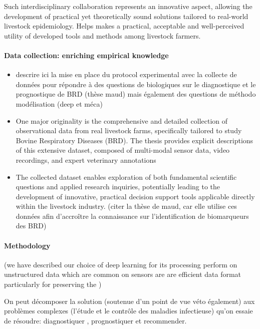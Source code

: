 Such interdisciplinary collaboration represents an innovative aspect, allowing the development of practical yet theoretically sound solutions tailored to real-world livestock epidemiology. Helps makes a practical, acceptable and well-perceived utility of developed tools and methods among livestock farmers.

\paragraph{Data collection: enriching empirical knowledge}

\begin{itemize}
    \item descrire ici la mise en place du protocol experimental avec la collecte de données pour répondre à des questions de biologiques sur le diagnostique et le prognostique de BRD (thèse maud) mais également des questions de méthodo modélisation (deep et méca)
    \item One major originality is the comprehensive and detailed collection of observational data from real livestock farms, specifically tailored to study Bovine Respiratory Diseases (BRD). The thesis provides explicit descriptions of this extensive dataset, composed of multi-modal sensor data, video recordings, and expert veterinary annotations
    \item The collected dataset enables exploration of both fundamental scientific questions and applied research inquiries, potentially leading to the development of innovative, practical decision support tools applicable directly within the livestock industry. (citer la thèse de maud, car elle utilise ces données afin d'accroître la connaissance sur l'identification de biomarqueurs des BRD) 
\end{itemize}




\paragraph{Methodology}

(we have described our choice of deep learning for its processing perform on unstructured data which are common on sensors are are efficient data format particularly for preserving the )

On peut décomposer la solution (soutenue d'un point de vue véto également) aux problèmes complexes (l'étude et le contrôle des maladies infectieuse) qu'on essaie de résoudre: diagnostiquer , prognostiquer et recommender.

